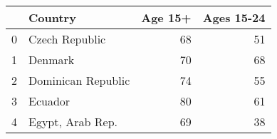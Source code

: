\begin{tabular}{llrr}
\toprule
 & Country & Age 15+ & Ages 15-24 \\
\midrule
0 & Czech Republic & 68 & 51 \\
1 & Denmark & 70 & 68 \\
2 & Dominican Republic & 74 & 55 \\
3 & Ecuador & 80 & 61 \\
4 & Egypt, Arab Rep. & 69 & 38 \\
\bottomrule
\end{tabular}
